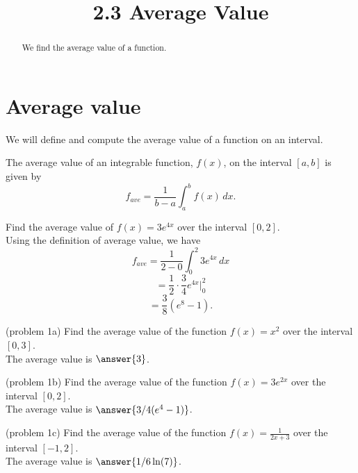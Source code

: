 \documentclass[handout]{ximera}
\title{2.3 Average Value}
\begin{document}
\begin{abstract}
We find the average value of a function.
\end{abstract}

\maketitle

\section{Average value}
We will define and compute the average value of a function on an interval. 

\begin{definition} The average value of an integrable function, $f(x)$, on the interval $[a,b]$ is given by
\[
f_{ave} = \frac{1}{b-a} \int_a^b f(x) \, dx.
\]
\end{definition}

\begin{example}[example 1]
Find the average value of $f(x) = 3e^{4x}$ over the interval $[0, 2]$.\\
Using the definition of average value, we have
\[
f_{ave} = \frac{1}{2-0} \int_0^2 3e^{4x} \, dx
\]
\[
= \frac12 \cdot \frac34e^{4x} \bigg|_0^2
\]
\[
= \frac38 \left(e^8 - 1\right).
\]
\end{example}




\begin{problem}(problem 1a)
Find the average value of the function $f(x) = x^2$ over the interval $[0, 3]$.\\
The average value is $\answer{3}$.
\end{problem}





\begin{problem}(problem 1b)
Find the average value of the function $f(x) = 3e^{2x}$ over the interval $[0, 2]$.\\
The average value is $\answer{3/4 (e^4 - 1)}$.
\end{problem}




\begin{problem}(problem 1c)
Find the average value of the function $f(x) = \displaystyle{\frac{1}{2x+3}}$ over the interval $[-1, 2]$.\\
The average value is $\answer{1/6 \ln(7)}$.
\end{problem}
\end{document}
